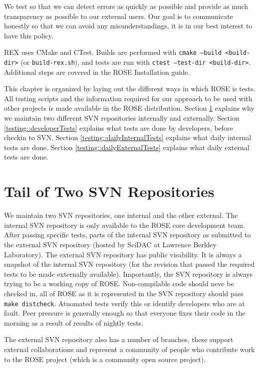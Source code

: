    We test so that we can detect errors as quickly as possible and
provide as much transparency as possible to our external users.
Our goal is to communicate honestly so that we can avoid any 
misunderstandings, it is in our best interest to have this
policy.

   REX uses CMake and CTest. Builds are performed with
{\tt cmake --build <build-dir>} (or {\tt build-rex.sh}), and tests are run with
{\tt ctest --test-dir <build-dir>}. Additional steps are covered in the
ROSE Installation guide.

This chapter is organized by laying out the different
ways in which ROSE is tests.  All testing scripts and the information
required for our approach to be used with other projects is made available
in the ROSE distribution. 
Section \ref{testing::twoRepositories} explains why we maintain two
different SVN repositories internally and externally.
Section \ref{testing::developerTests} explains what tests are done by developers, before checkin to SVN.
Section \ref{testing::dailyInternalTests} explains what daily internal tests are done.
Section \ref{testing::dailyExternalTests} explains what daily external tests are done.

\section{Tail of Two SVN Repositories}
\label{testing::twoRepositories}
   We maintain two SVN repositories, one internal and the other external.
The internal SVN repository is only available to the ROSE core
development team.  After passing specific tests, parts of the internal
SVN repository as submitted to the external SVN repository (hosted by SciDAC at 
Lawrence Berkley Laboratory).  The external SVN repository has public
visability.  It is always a snapshot of the internal SVN repository 
(for the revision that passed the required tests to be made externally available).
Importantly, the SVN repository is always trying to be a working copy of
ROSE. Non-compilable code should neve be checked in, all of ROSE as it
is represented in the SVN repository should pass {\tt make distcheck}.
Atuomated tests verify this or identify developers who are at fault.
Peer pressure is generally enough so that everyone fixes their code 
in the morning as a result of results of nightly tests.

   The external SVN repository also has a number of branches, these support
external collaborations and represent a community of people who contribute
work to the ROSE project (which is a community open source project).


